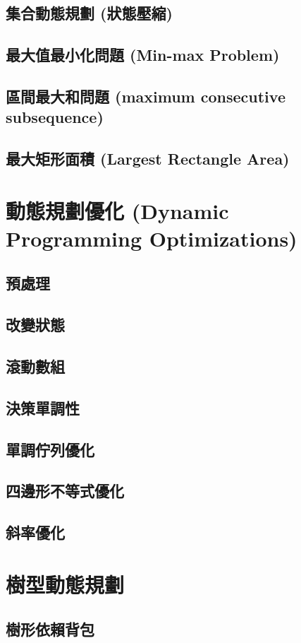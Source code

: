 \documentclass[12pt,a4paper,oneside]{report}
\begin{document}
\begin{CJK}{UTF8}{bkai}
\subsection{集合動態規劃 (狀態壓縮)}
\subsection{最大值最小化問題 (Min-max Problem)}
\subsection{區間最大和問題 (maximum consecutive subsequence)}
\subsection{最大矩形面積 (Largest Rectangle Area)}

\section{動態規劃優化 (Dynamic Programming Optimizations)}

\subsection{預處理}
\subsection{改變狀態}
\subsection{滾動數組}
\subsection{決策單調性}
\subsection{單調佇列優化}
\subsection{四邊形不等式優化}
\subsection{斜率優化}

\section{樹型動態規劃}

\subsection{樹形依賴背包}

\ifx \allfiles \undefined

\printindex[noun]
\clearpage

\end{CJK}
\end{document}
